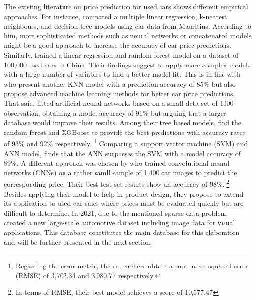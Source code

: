 \documentclass[12pt]{article}
\begin{document}
\noindent The existing literature on price prediction for used cars shows different empirical approaches. For instance, \cite{Pudaruth2014} compared a multiple linear regression, k-nearest neighbours, and decision tree models using car data from Mauritius. According to him, more sophisticated methods such as neural networks or concatenated models might be a good approach to increase the accuracy of car price predictions. Similarly, \cite{chen2017comparative} trained a linear regression and random forest model on a dataset of 100,000 used cars in China. Their findings suggest to apply more complex models with a large number of variables to find a better model fit. This is in line with \cite{Samruddhi2020} who present another KNN model with a prediction accuracy of 85\% but also propose advanced machine learning methods for better car price predictions. That said, \cite{Karakoç2020} fitted artificial neural networks based on a small data set of 1000 observation, obtaining a model accuracy of 91\% but arguing that a larger database would improve their results. Among their tree based models, \cite{Gajera2021} find the random forest and XGBoost to provide the best predictions with accuracy rates of 93\% and 92\% respectively. \footnote{Regarding the error metric, the researchers obtain a root mean squared error (RMSE) of 3,702.34 and 3,980.77 respectively.} Comparing a support vector machine (SVM) and ANN model, \cite{Bilen2021} finds that the ANN surpasses the SVM with a model accuracy of 89\%. A different approach was chosen by \cite{yang2018ai} who trained convolutional neural networks (CNNs) on a rather samll sample of 1,400 car images to predict the corresponding price. Their best test set results show an accuracy of 98\%. \footnote{In terms of RMSE, their best model achieves a score of 10,577.47} Besides applying their model to help in product design, they propose to extend its application to used car sales where prices must be evaluated quickly but are difficult to determine. In 2021, due to the mentioned sparse data problem, \cite{huang2023dvmcar} created a new large-scale automotive dataset including image data for visual applications. This database constitutes the main database for this elaboration and will be further presented in the next section. \\
\end{document}
